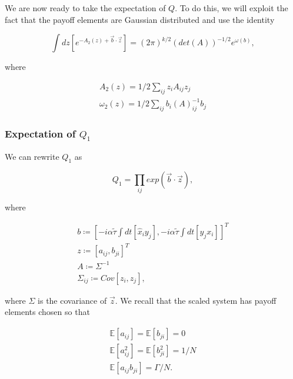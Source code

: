 \documentclass{article}
\begin{document}
	We are now ready to take the expectation of $Q$. To do this, we will exploit the fact that the
	payoff elements are Gaussian distributed and use the identity \cite{QFTbook}

	\begin{equation}
	\label{eqn::expectationIdentity}
		\int dz [e^{-A_2(z) + \Vec{b} \cdot \Vec{z}}] = (2 \pi)^{k/2} (det(A))^{-1/2} e^{\omega(b)},
	\end{equation}

	where

	\begin{equation*}
		\begin{split}
			A_2(z) = 1/2 \sum_{ij} z_i A_{ij} z_j \\
			\omega_2(z) = 1/2 \sum_{ij} b_i (A)^{-1}_{ij} b_j
		\end{split}
	\end{equation*}

	\subsubsection{Expectation of $Q_1$} %
	\label{ssub:expectation_of_Q1}
	
	We can rewrite $Q_1$ as 

	\begin{equation*}
		Q_1 = \prod_{ij} exp(\Vec{b} \cdot \Vec{z}),
	\end{equation*}

	where

	\begin{equation*}
		\begin{split}
			b \coloneqq [-i \alpha \tilde{\tau} \int dt[\hat{x}_i y_j], -i \alpha \tilde{\tau} \int
			dt[\hat{y}_j x_i]]^T \\
			z \coloneqq [a_{ij}, b_{ji}]^T\\
			A \coloneqq \Sigma^{-1}\\
			\Sigma_{ij} \coloneqq Cov[z_i, z_j],
		\end{split}
	\end{equation*}

	where $\Sigma$ is the covariance of $\Vec{z}$. We recall that the scaled system has
	payoff elements chosen so that

	\begin{equation*}
		\begin{split}
			\mathbb{E}[a_{ij}] = \mathbb{E}[b_{ji}] = 0\\
			\mathbb{E}[a_{ij}^2] = \mathbb{E}[b_{ji}^2] = 1/N\\
			\mathbb{E}[a_{ij} b_{ji}] = \Gamma /N.
		\end{split}
	\end{equation*}
\end{document}
